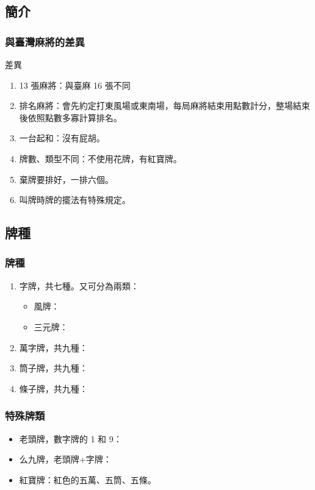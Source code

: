 \documentclass[utf8]{beamer}
\begin{document}
\begin{CJK}{UTF8}{bkai}
\subsection{簡介}
\begin{frame}
  \frametitle{與臺灣麻將的差異}
  \begin{alertblock}{差異}
    \begin{enumerate}
    \item 13 張麻將：與臺麻 16 張不同
    \item 排名麻將：會先約定打\alert{東風場}或\alert{東南場}，每局麻將結束用\alert{點數}計分，整場結束後依照點數多寡計算排名。
    \item 一台起和：沒有屁胡。
    \item 牌數、類型不同：不使用花牌，有紅寶牌。
    \item 棄牌要排好，一排六個。
    \item 叫牌時牌的擺法有特殊規定。
    \end{enumerate}
  \end{alertblock}
\end{frame}

\subsection{牌種}
\begin{frame}
  \frametitle{牌種}
  \begin{enumerate}
  \item 字牌，共七種。又可分為兩類：
    \begin{itemize}
    \item 風牌：\Wind
    \item 三元牌：\Dragon
    \end{itemize}
  \item 萬字牌，共九種：\Wan
  \item 筒子牌，共九種：\Tong
  \item 條子牌，共九種：\Tiao
  \end{enumerate}
\end{frame}

\begin{frame}
  \frametitle{特殊牌類}
  \begin{itemize}
  \item \alert{老頭牌}，數字牌的 1 和 9：\OldMan
  \item \alert{么九牌}，老頭牌+字牌：
    \begin{figure}
    \centering
    \OneNine
    \end{figure}
  \item \alert{紅寶牌}：紅色的五萬、五筒、五條。
  \end{itemize}
\end{frame}


\end{CJK}
\end{document}
